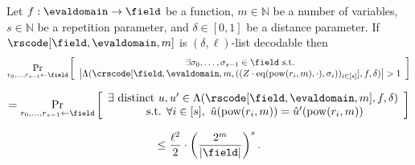 \begin{lemma}\label{lemma:out_of_domain_sampling_crs_eq_rs}
    Let $f : \evaldomain \rightarrow \field$ be a function, $m \in \mathbb{N}$ be a number of variables, $s \in \mathbb{N}$ be a repetition parameter, and $\delta \in [0,1]$ be a distance parameter. If $\rscode[\field, \evaldomain, m]$ is $(\delta, \ell)$-list decodable then
    \[
    \Pr_{r_0, \dots, r_{s-1} \leftarrow \field} \left[
    \begin{array}{c}
    \exists \sigma_0, \dots, \sigma_{s-1} \in \field \text{ s.t.} \\
    \left| \Lambda(\crscode[\field, \evaldomain, m, ((Z \cdot \mathrm{eq}(\mathrm{pow}(r_{i}, m), \cdot), \sigma_{i}))_{i \in [s]}], f, \delta) \right| > 1
    \end{array}
    \right]
    \]

    \[
    = \Pr_{r_0, \dots, r_{s-1} \leftarrow \field} \left[
    \begin{array}{c}
    \exists \text{ distinct } u, u' \in \Lambda(\rscode[\field, \evaldomain, m], f, \delta) \\
    \text{ s.t. } \forall i \in [s],\ \hat{u}(\mathrm{pow}(r_i, m)) = \hat{u}'(\mathrm{pow}(r_i, m))
    \end{array}
    \right]
    \]

    \[
    \leq \frac{\ell^2}{2} \cdot \left( \frac{2^m}{|\field|} \right)^s.
    \]
\end{lemma}

